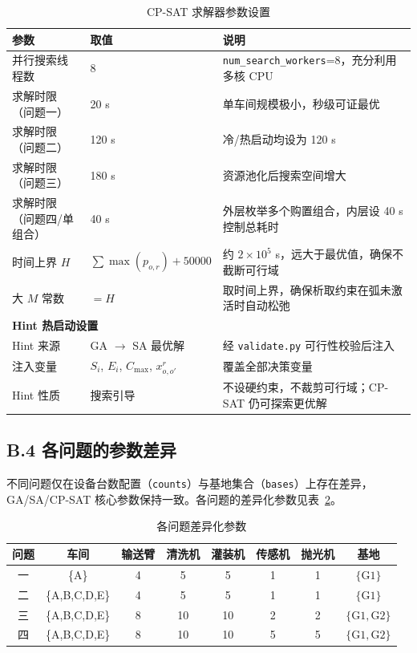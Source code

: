 \documentclass[12pt,a4paper]{ctexart}
\begin{document}
\begin{table}[H]
\centering
\caption{CP-SAT 求解器参数设置}\label{tab:cpsat-params}
\begin{tabular}{p{4.5cm} p{4.0cm} p{6.0cm}}
\toprule
\textbf{参数} & \textbf{取值} & \textbf{说明} \\
\midrule
并行搜索线程数 & 8 & \texttt{num\_search\_workers}=8，充分利用多核 CPU \\
求解时限（问题一） & 20 s & 单车间规模极小，秒级可证最优 \\
求解时限（问题二） & 120 s & 冷/热启动均设为 120 s \\
求解时限（问题三） & 180 s & 资源池化后搜索空间增大 \\
求解时限（问题四/单组合） & 40 s & 外层枚举多个购置组合，内层设 40 s 控制总耗时 \\
时间上界 $H$ & $\sum\max(p_{o,r})+50000$ & 约 $2\times 10^5$ s，远大于最优值，确保不截断可行域 \\
大 $M$ 常数 & $=H$ & 取时间上界，确保析取约束在弧未激活时自动松弛 \\
\midrule
\multicolumn{3}{l}{\textbf{Hint 热启动设置}} \\
\midrule
Hint 来源 & GA $\rightarrow$ SA 最优解 & 经 \texttt{validate.py} 可行性校验后注入 \\
注入变量 & $S_i$, $E_i$, $C_{\max}$, $x^{r}_{o,o'}$ & 覆盖全部决策变量 \\
Hint 性质 & 搜索引导 & 不设硬约束，不裁剪可行域；CP-SAT 仍可探索更优解 \\
\bottomrule
\end{tabular}
\end{table}

\subsection*{B.4 各问题的参数差异}

不同问题仅在设备台数配置（\texttt{counts}）与基地集合（\texttt{bases}）上存在差异，GA/SA/CP-SAT 核心参数保持一致。各问题的差异化参数见表~\ref{tab:prob-params}。

\begin{table}[H]
\centering
\caption{各问题差异化参数}\label{tab:prob-params}
\begin{tabular}{c c c c c c c c}
\toprule
\textbf{问题} & \textbf{车间} & \textbf{输送臂} & \textbf{清洗机} & \textbf{灌装机} & \textbf{传感机} & \textbf{抛光机} & \textbf{基地} \\
\midrule
一 & \{A\} & 4 & 5 & 5 & 1 & 1 & $\{\mathrm{G1}\}$ \\
二 & \{A,B,C,D,E\} & 4 & 5 & 5 & 1 & 1 & $\{\mathrm{G1}\}$ \\
三 & \{A,B,C,D,E\} & 8 & 10 & 10 & 2 & 2 & $\{\mathrm{G1},\mathrm{G2}\}$ \\
四 & \{A,B,C,D,E\} & 8 & 10 & 10 & 5 & 5 & $\{\mathrm{G1},\mathrm{G2}\}$ \\
\bottomrule
\end{tabular}
\end{table}
\end{document}
